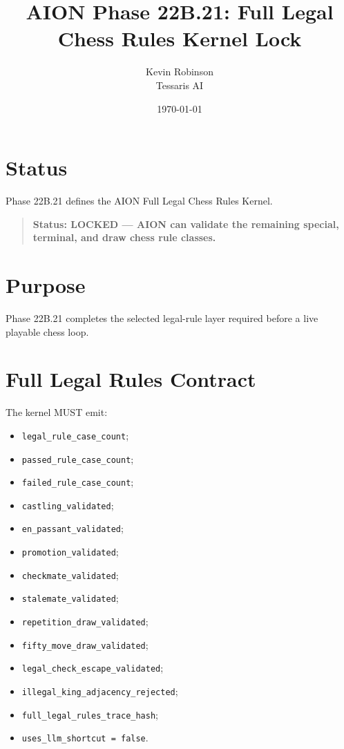 \documentclass[11pt,a4paper]{article}
\title{\textbf{AION Phase 22B.21: Full Legal Chess Rules Kernel Lock}}
\author{Kevin Robinson\\Tessaris AI}
\date{\today}
\begin{document}
\maketitle

\section{Status}

Phase 22B.21 defines the AION Full Legal Chess Rules Kernel.

\begin{quote}
\textbf{Status: LOCKED --- AION can validate the remaining special, terminal, and draw chess rule classes.}
\end{quote}

\section{Purpose}

Phase 22B.21 completes the selected legal-rule layer required before a live playable chess loop.

\section{Full Legal Rules Contract}

The kernel MUST emit:

\begin{itemize}
  \item \texttt{legal\_rule\_case\_count};
  \item \texttt{passed\_rule\_case\_count};
  \item \texttt{failed\_rule\_case\_count};
  \item \texttt{castling\_validated};
  \item \texttt{en\_passant\_validated};
  \item \texttt{promotion\_validated};
  \item \texttt{checkmate\_validated};
  \item \texttt{stalemate\_validated};
  \item \texttt{repetition\_draw\_validated};
  \item \texttt{fifty\_move\_draw\_validated};
  \item \texttt{legal\_check\_escape\_validated};
  \item \texttt{illegal\_king\_adjacency\_rejected};
  \item \texttt{full\_legal\_rules\_trace\_hash};
  \item \texttt{uses\_llm\_shortcut = false}.
\end{itemize}
\end{document}
